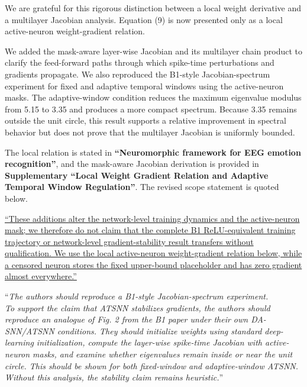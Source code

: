 \documentclass[12pt,technote,onecolumn]{IEEEtran}
\begin{document}

We are grateful for this rigorous distinction between a local weight derivative and a multilayer Jacobian analysis. Equation (9) is now presented only as a local active-neuron weight-gradient relation.

We added the mask-aware layer-wise Jacobian and its multilayer chain
product to clarify the feed-forward paths through which spike-time
perturbations and gradients propagate. We also reproduced the B1-style
Jacobian-spectrum experiment for fixed and adaptive temporal windows using
the active-neuron masks. The adaptive-window condition reduces the maximum
eigenvalue modulus from 5.15 to 3.35 and produces a more compact spectrum.
Because 3.35 remains outside the unit circle, this result supports a
relative improvement in spectral behavior but does not prove that the
multilayer Jacobian is uniformly bounded.

The local relation is stated in \textbf{``Neuromorphic framework for EEG emotion recognition''}, and the mask-aware Jacobian derivation is provided in \textbf{Supplementary ``Local Weight Gradient Relation and Adaptive Temporal Window Regulation''}. The revised scope statement is quoted below.

\uline{``These additions alter the network-level training dynamics and the active-neuron mask; we therefore do not claim that the complete B1 ReLU-equivalent training trajectory or network-level gradient-stability result transfers without qualification. We use the local active-neuron weight-gradient relation below, while a censored neuron stores the fixed upper-bound placeholder and has zero gradient almost everywhere.''}

\vspace{4mm}

``{\it The authors should reproduce a B1-style Jacobian-spectrum experiment.\\
To support the claim that ATSNN stabilizes gradients, the authors should
reproduce an analogue of Fig. 2 from the B1 paper under their own
DA-SNN/ATSNN conditions. They should initialize weights using standard
deep-learning initialization, compute the layer-wise spike-time Jacobian
with active-neuron masks, and examine whether eigenvalues remain inside
or near the unit circle. This should be shown for both fixed-window and
adaptive-window ATSNN. Without this analysis, the stability claim
remains heuristic.}''
\vspace{1mm}
\end{document}
